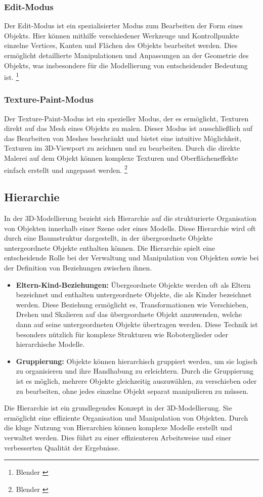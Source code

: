 \subsubsection{Edit-Modus}
Der Edit-Modus ist ein spezialisierter Modus zum Bearbeiten der Form eines Objekts. Hier können mithilfe verschiedener
Werkzeuge und Kontrollpunkte einzelne Vertices, Kanten und Flächen des Objekts bearbeitet werden. Dies ermöglicht
detaillierte Manipulationen und Anpassungen an der Geometrie des Objekts, was insbesondere für die Modellierung von
entscheidender Bedeutung ist. \footnote{Blender \cite{Vertices}}

\subsubsection{Texture-Paint-Modus}
Der Texture-Paint-Modus ist ein spezieller Modus, der es ermöglicht, Texturen direkt auf das Mesh
eines Objekts zu malen. Dieser Modus ist ausschließlich auf das Bearbeiten von Meshes beschränkt und bietet eine intuitive
Möglichkeit, Texturen im 3D-Viewport zu zeichnen und zu bearbeiten. Durch die direkte Malerei auf dem Objekt können
komplexe Texturen und Oberflächeneffekte einfach erstellt und angepasst werden. \footnote{Blender \cite{Mesh}}

\subsection{Hierarchie}
In der 3D-Modellierung bezieht sich Hierarchie auf die strukturierte Organisation von Objekten innerhalb einer Szene
oder eines Modells. Diese Hierarchie wird oft durch eine Baumstruktur dargestellt, in der übergeordnete Objekte
untergeordnete Objekte enthalten können. Die Hierarchie spielt eine entscheidende Rolle bei der Verwaltung und
Manipulation von Objekten sowie bei der Definition von Beziehungen zwischen ihnen.

\begin{itemize}
    \item \textbf{Eltern-Kind-Beziehungen:} Übergeordnete Objekte werden oft als Eltern bezeichnet und enthalten
    untergeordnete Objekte, die als Kinder bezeichnet werden. Diese Beziehung ermöglicht es, Transformationen wie
    Verschieben, Drehen und Skalieren auf das übergeordnete Objekt anzuwenden, welche dann auf seine untergeordneten
    Objekte übertragen werden. Diese Technik ist besonders nützlich für komplexe Strukturen wie Roboterglieder oder
    hierarchische Modelle.
    \item \textbf{Gruppierung:} Objekte können hierarchisch gruppiert werden, um sie logisch zu organisieren und ihre
    Handhabung zu erleichtern. Durch die Gruppierung ist es möglich, mehrere Objekte gleichzeitig auszuwählen, zu
    verschieben oder zu bearbeiten, ohne jedes einzelne Objekt separat manipulieren zu müssen.
\end{itemize}
Die Hierarchie ist ein grundlegendes Konzept in der 3D-Modellierung. Sie ermöglicht eine effiziente Organisation und
Manipulation von Objekten. Durch die kluge Nutzung von Hierarchien können komplexe Modelle erstellt und verwaltet werden.
Dies führt zu einer effizienteren Arbeitsweise und einer verbesserten Qualität der Ergebnisse.

